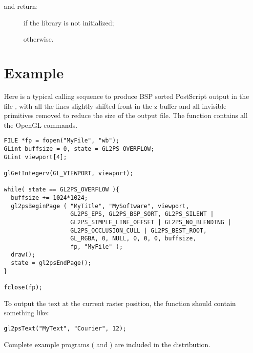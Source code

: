 \noindent{} and  return:
\begin{description}
\item[] if the library is not initialized;
\item[] otherwise.
\end{description}


\section{Example}

Here is a typical calling sequence to produce BSP sorted PostScript output
in the file , with all the lines slightly shifted front in the
z-buffer and all invisible primitives removed to reduce the size of the
output file. The  function contains all the OpenGL commands.

\begin{verbatim}
FILE *fp = fopen("MyFile", "wb");
GLint buffsize = 0, state = GL2PS_OVERFLOW;
GLint viewport[4];

glGetIntegerv(GL_VIEWPORT, viewport);

while( state == GL2PS_OVERFLOW ){ 
  buffsize += 1024*1024;
  gl2psBeginPage ( "MyTitle", "MySoftware", viewport,
                   GL2PS_EPS, GL2PS_BSP_SORT, GL2PS_SILENT |
                   GL2PS_SIMPLE_LINE_OFFSET | GL2PS_NO_BLENDING |
                   GL2PS_OCCLUSION_CULL | GL2PS_BEST_ROOT,
                   GL_RGBA, 0, NULL, 0, 0, 0, buffsize,
                   fp, "MyFile" );
  draw(); 
  state = gl2psEndPage();
}

fclose(fp);
\end{verbatim}

\noindent To output the text  at the current raster position, the
 function should contain something like:

\begin{verbatim}
gl2psText("MyText", "Courier", 12);
\end{verbatim}

Complete example programs ( and )
are included in the distribution.


